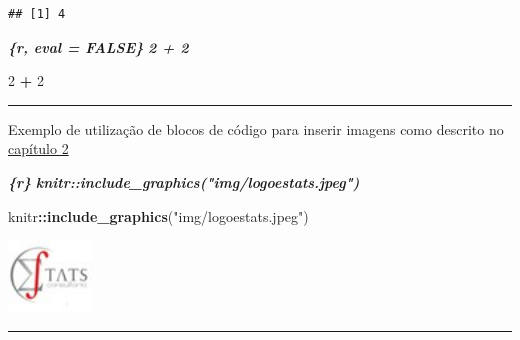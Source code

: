 \documentclass[
]{book}
\newenvironment{Shaded}{\begin{snugshade}}{\end{snugshade}}
\newcommand{\DecValTok}[1]{\textcolor[rgb]{0.00,0.00,0.81}{#1}}
\newcommand{\InformationTok}[1]{\textcolor[rgb]{0.56,0.35,0.01}{\textbf{\textit{#1}}}}
\newcommand{\KeywordTok}[1]{\textcolor[rgb]{0.13,0.29,0.53}{\textbf{#1}}}
\newcommand{\NormalTok}[1]{#1}
\newcommand{\OperatorTok}[1]{\textcolor[rgb]{0.81,0.36,0.00}{\textbf{#1}}}
\newcommand{\StringTok}[1]{\textcolor[rgb]{0.31,0.60,0.02}{#1}}
\begin{document}
\begin{verbatim}
## [1] 4
\end{verbatim}

\begin{Shaded}
\begin{Highlighting}[]
\InformationTok{\textasciigrave{}\textasciigrave{}\textasciigrave{}\{r, eval = FALSE\}}
\InformationTok{2 + 2}
\InformationTok{\textasciigrave{}\textasciigrave{}\textasciigrave{}}
\end{Highlighting}
\end{Shaded}

\begin{Shaded}
\begin{Highlighting}[]
\DecValTok{2} \OperatorTok{+}\StringTok{ }\DecValTok{2}
\end{Highlighting}
\end{Shaded}

\begin{center}\rule{0.5\linewidth}{0.5pt}\end{center}

Exemplo de utilização de blocos de código para inserir imagens como descrito no \protect\hyperlink{inserindo-imagens}{capítulo 2}

\begin{Shaded}
\begin{Highlighting}[]
\InformationTok{\textasciigrave{}\textasciigrave{}\textasciigrave{}\{r\}}
\InformationTok{knitr::include\_graphics("img/logoestats.jpeg")}
\InformationTok{\textasciigrave{}\textasciigrave{}\textasciigrave{}}
\end{Highlighting}
\end{Shaded}

\begin{Shaded}
\begin{Highlighting}[]
\NormalTok{knitr}\OperatorTok{::}\KeywordTok{include\_graphics}\NormalTok{(}\StringTok{"img/logoestats.jpeg"}\NormalTok{)}
\end{Highlighting}
\end{Shaded}

\begin{center}\includegraphics[width=0.89in]{img/logoestats} \end{center}

\begin{center}\rule{0.5\linewidth}{0.5pt}\end{center}
\end{document}
